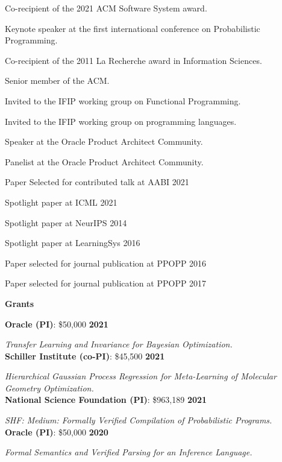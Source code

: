 \documentclass[margin,line]{res}
\begin{document}
\begin{resume}
Co-recipient of the 2021 ACM Software System award.

Keynote speaker at the first international conference on Probabilistic Programming. 

Co-recipient of the 2011 La Recherche award in Information Sciences.

Senior member of the ACM.

Invited to the IFIP working group on Functional Programming.

Invited to the IFIP working group on programming languages.

Speaker at the Oracle Product Architect Community.

Panelist at the Oracle Product Architect Community.

Paper Selected for contributed talk at AABI 2021

Spotlight paper at ICML 2021

Spotlight paper at NeurIPS 2014

Spotlight paper at LearningSys 2016

Paper selected for journal publication at PPOPP 2016

Paper selected for journal publication at PPOPP 2017

\newpage
{\bf {\Large Grants}}

{\bf Oracle (PI)}: \$50,000 \hfill {\bf 2021}
\vspace{-.4cm}

{\em Transfer Learning and Invariance for Bayesian Optimization.} \\

{\bf Schiller Institute (co-PI)}: \$45,500 \hfill {\bf 2021}
\vspace{-.4cm}

{\em Hierarchical Gaussian Process Regression for Meta-Learning of Molecular Geometry Optimization.} \\

{\bf National Science Foundation (PI)}: \$963,189  \hfill {\bf 2021}
\vspace{-.4cm}

{\em SHF: Medium: Formally Verified Compilation of Probabilistic Programs.}\\

{\bf Oracle (PI)}: \$50,000 \hfill {\bf 2020}
\vspace{-.4cm}

{\em Formal Semantics and Verified Parsing for an Inference Language.} \\


\end{resume}
\end{document}
